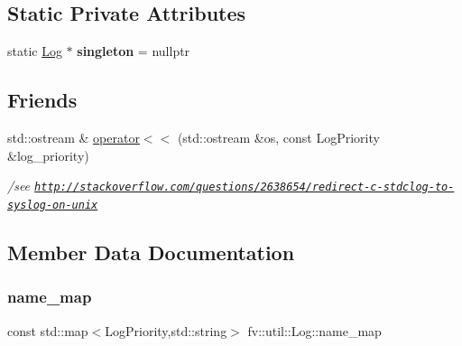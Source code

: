 \subsection*{Static Private Attributes}
\begin{DoxyCompactItemize}
\item 
\hypertarget{classfv_1_1util_1_1Log_aa65dbac5964f7d5c2a68308e42912350}{}\label{classfv_1_1util_1_1Log_aa65dbac5964f7d5c2a68308e42912350} 
static \hyperlink{classfv_1_1util_1_1Log}{Log} $\ast$ {\bfseries singleton} = nullptr
\end{DoxyCompactItemize}
\subsection*{Friends}
\begin{DoxyCompactItemize}
\item 
\hypertarget{classfv_1_1util_1_1Log_a0424ebdae6a085efdf86eef68d4290bb}{}\label{classfv_1_1util_1_1Log_a0424ebdae6a085efdf86eef68d4290bb} 
std\+::ostream \& \hyperlink{classfv_1_1util_1_1Log_a0424ebdae6a085efdf86eef68d4290bb}{operator$<$$<$} (std\+::ostream \&os, const Log\+Priority \&log\+\_\+priority)
\begin{DoxyCompactList}\small\item\em /see \href{http://stackoverflow.com/questions/2638654/redirect-c-stdclog-to-syslog-on-unix}{\tt http\+://stackoverflow.\+com/questions/2638654/redirect-\/c-\/stdclog-\/to-\/syslog-\/on-\/unix} \end{DoxyCompactList}\end{DoxyCompactItemize}


\subsection{Member Data Documentation}
\hypertarget{classfv_1_1util_1_1Log_a9fdd4bed5ad2aabb71418e9244fe25fd}{}\label{classfv_1_1util_1_1Log_a9fdd4bed5ad2aabb71418e9244fe25fd} 
\subsubsection{\texorpdfstring{name\+\_\+map}{name\_map}}
{\footnotesize\ttfamily const std\+::map$<$Log\+Priority,std\+::string$>$ fv\+::util\+::\+Log\+::name\+\_\+map\hspace{0.3cm}{\ttfamily [private]}}

